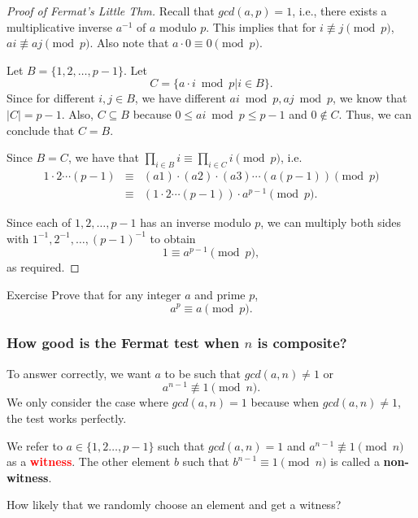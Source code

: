 \begin{frame}
  \begin{proof}[Proof of Fermat's Little Thm]
    {\small
    Recall that $gcd(a,p)=1$, i.e., there exists a multiplicative
    inverse $a^{-1}$ of $a$ modulo $p$.  This implies that for
    $i\not\equiv j \pmod p$, $ai\not\equiv aj \pmod p$.
    Also note that $a\cdot 0\equiv 0\pmod p$.

    \pause
    Let $B=\{1,2,\ldots,p-1\}$.  Let
    \[
    C = \{a\cdot i \bmod p | i\in B\}.
    \]
    \pause
    Since for different $i,j\in B$, we have different $ai\bmod p,
    aj\bmod p$, we know that $|C|=p-1$.  Also, $C\subseteq B$ because
    $0\leq ai\bmod p\leq p-1$ and $0\not\in C$.  Thus, we can conclude that $C=B$.

    \pause
    Since $B=C$, we have that $\prod_{i\in B}i\equiv \prod_{i\in C}i \pmod p$, i.e.
    \[
    \begin{array}{rcl}
      1\cdot 2\cdots (p-1)
      &\equiv& (a1)\cdot (a2)\cdot(a3)\cdots(a(p-1)) \pmod p\\
      &\equiv& (1\cdot 2\cdots (p-1))\cdot a^{p-1} \pmod p.
    \end{array}
    \]

    Since each of $1,2,\ldots,p-1$ has an inverse modulo $p$, we can
    multiply both sides with $1^{-1}, 2^{-1},\ldots,(p-1)^{-1}$ to obtain
    \[
    1\equiv a^{p-1} \pmod p,
    \]
    as required.
    
    }
  \end{proof}
\end{frame}

\begin{frame}
  \begin{block}{Exercise}
    Prove that for any integer $a$ and prime $p$,
    \[
    a^{p}\equiv a \pmod p.
    \]
  \end{block}
  \vspace{2.5in}
\end{frame}

\begin{frame}
  \frametitle{How good is the Fermat test when $n$ is composite?}

  To answer correctly, we want $a$ to be such that $gcd(a,n)\neq 1$ or
  \[
  a^{n-1}\not\equiv 1 \pmod n.
  \]
  \pause We only consider the case where $gcd(a,n)=1$ because when
  $gcd(a,n)\neq 1$, the test works perfectly.

  \vspace{0.2in} \pause

  We refer to $a\in\{1,2\ldots, p-1\}$ such that $gcd(a,n)=1$ and
  $a^{n-1}\not\equiv 1\pmod n$ as a \textcolor{red}{\bf witness}.  The
  other element $b$ such that $b^{n-1}\equiv 1\pmod n$ is called a
  {\bf non-witness}.

  How likely that we randomly choose an element and get a
  witness?
  
\end{frame}

